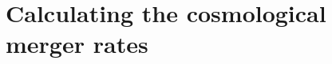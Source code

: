\documentclass[twocolumn]{aastex63}
\newcommand\rate{\mathcal{R}}
\newcommand\bhnsSingle{BHNS\xspace}
\newcommand{\monef}{\ensuremath{m_{1,\rm{f}}}\xspace}
\newcommand{\mtwof}{\ensuremath{m_{2,\rm{f}}}\xspace}
\newcommand{\Msun}{\ensuremath{\,\rm{M}_{\odot}}\xspace}
\newcommand{\MSFR}{\ensuremath{{M}_{\rm{SFR}}}\xspace}
\newcommand{\tdelay}{\ensuremath{{t}_{\rm{delay}}}\xspace}
\newcommand{\Nform}{\ensuremath{{N}_{\rm{form}}}\xspace}
\newcommand*\diff{\mathop{}\!\mathrm{d}}
\begin{document}
%
%
%
%








\section{Calculating the cosmological merger rates}
\label{sec:app-calculating-merger-distributionsMSSFR}
%
%
\end{document}
